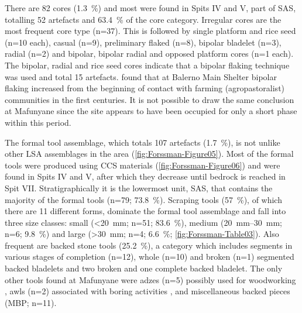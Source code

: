 There are 82 cores (\SI{1.3}{\percent}) and most were found in Spits IV and V, part of SAS, totalling 52 artefacts and \SI{63.4}{\percent} of the core category. 
Irregular cores are the most frequent core type (n=37). 
This is followed by single platform and rice seed (n=10 each), casual (n=9), preliminary flaked (n=8), bipolar bladelet (n=3), radial (n=2) and bipolar, bipolar radial and opposed platform cores (n=1 each). 
The bipolar, radial and rice seed cores indicate that a bipolar flaking technique was used \parencite[see][]{vanDoornum_2005}
 and total 15 artefacts. 
 \textcite[259]{vanDoornum_2008} found that at Balerno Main Shelter bipolar flaking increased from the beginning of contact with farming (agropastoralist) communities in the first centuries\AD. 
 It is not possible to draw the same conclusion at Mafunyane since the site appears to have been occupied for only a short phase within this period.
 
 The formal tool assemblage, which totals 107  artefacts (\SI{1.7}{\percent}), 
is not unlike other LSA assemblages in the area \parencite{vanDoornum_2005}(\cref{fig:Forssman-Figure05}). 
Most of the formal tools were produced using CCS materials (\cref{fig:Forssman-Figure06})
  and were found in Spits IV and V, after which they decrease until bedrock is reached in Spit VII. Stratigraphically it is the lowermost unit, SAS, that contains the majority of the formal tools (n=79; \SI{73.8}{\percent}). 
  Scraping tools (\SI{57}{\percent}), of which there are 11 different forms,
   dominate the formal tool assemblage and fall into three size classes: 
   small (<\SI{20}{\milli\meter}; n=51; \SI{83.6}{\percent}), 
   medium (\SIrange{20}{30}{\milli\meter}; n=6; \SI{9.8}{\percent}) and large (>\SI{30}{\milli\meter}; n=4; \SI{6.6}{\percent}; 
   \cref{fig:Forssman-Table03}). 
 Also frequent are backed stone tools (\SI{25.2}{\percent}), a category which includes segments in various stages of completion (n=12), 
whole (n=10) and broken (n=1) segmented backed bladelets and two broken and one complete backed bladelet. 
The only other tools found at Mafunyane were adzes (n=5) possibly used for woodworking \parencite{Walker_1994}, awls (n=2) associated with boring activities \parencite{Deacon_1984a}, and miscellaneous backed pieces (MBP; n=11). 
   
